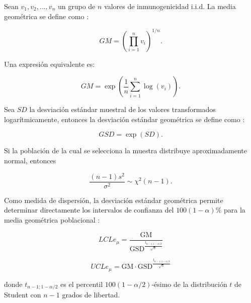 \begin{definition}  
	Sean $v_1,v_2,\ldots,v_n$ un grupo de $n$ valores de inmunogenicidad i.i.d. La media geométrica se define como \cite{nauta2020}:
	
	\begin{equation}
		\label{eq:gmt_1}
		GM = \left(\prod_{i=1}^{n} v_i \right)^{1/n}.
	\end{equation}
	
	Una expresión equivalente es:
	
	\begin{equation}
		\label{eq:gmt_2}
		GM = \exp\left(\frac{1}{n}\sum_{i=1}^{n}\log(v_i)\right).
	\end{equation}
	
\end{definition}

\begin{definition}  
	Sea $SD$ la desviación estándar muestral de los valores transformados logarítmicamente, entonces la desviación estándar geométrica se define como \cite{nauta2020}:
	
	\begin{equation}
		\label{eq:gsd_1}
		GSD = \exp(SD).
	\end{equation}
	
	Si la población de la cual se selecciona la muestra distribuye aproximadamente normal, entonces
	
	\begin{equation}
		\label{eq:with_chisquare}
		\frac{(n-1)s^2}{\sigma^2} \sim \chi^2(n-1).
	\end{equation}
	
\end{definition}

Como medida de dispersión, la desviación estándar geométrica permite determinar directamente los intervalos de confianza del $100(1-\alpha)\%$ para la media geométrica poblacional \cite{nauta2020}:

\begin{equation}
	\label{eq:LCL}
	LCLe_\mu = \frac{\text{GM}}{\text{GSD}^{\frac{t_{n-1; 1-\alpha/2}}{\sqrt{n}}}}
\end{equation}

\begin{equation}
	\label{eq:UCL}
	UCLe_\mu = \text{GM} \cdot \text{GSD}^{\frac{t_{n-1; 1-\alpha/2}}{\sqrt{n}}}
\end{equation}

donde $t_{n-1; 1-\alpha/2}$ es el percentil $100(1-\alpha/2)$-ésimo de la distribución $t$ de Student con $n - 1$ grados de libertad.

